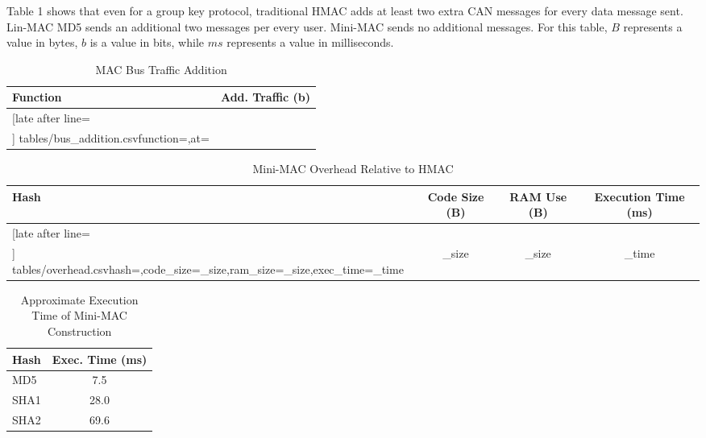 Table 1 shows that even for a group key protocol, traditional HMAC adds at least two extra CAN messages for every data message sent. Lin-MAC MD5 sends an additional two messages per every user. Mini-MAC sends no additional messages. For this table, $B$ represents a value in bytes, $b$ is a value in bits, while $ms$ represents a value in milliseconds.
	
	\begin{table}
	\centering
	\caption{MAC Bus Traffic Addition}
	\vspace{8pt}
	\begin{tabular}{|l|c|}\hline%
	\bfseries Function & \bfseries Add. Traffic (b) \\\hline \csvreader[late after line=\\]%
		{tables/bus_addition.csv}{function=\function,at=\at}%
		{\function & \at}%
		\hline
	\end{tabular}
	\end{table}

	\begin{table}	
	\centering	
	\caption{Mini-MAC Overhead Relative to HMAC}
	\vspace{8pt}
	\begin{tabular}{|l|c|c|c|}\hline%
	\bfseries Hash & \bfseries Code Size (B) & \bfseries RAM Use (B) & \bfseries Execution Time (ms)\\\hline \csvreader[late after line=\\]%
		{tables/overhead.csv}{hash=\hash,code_size=\code_size,ram_size=\ram_size,exec_time=\exec_time}%
		{\hash & \code_size & \ram_size & \exec_time}%
		\hline
	\end{tabular}
	\end{table}
	
	\begin{table}
	\centering
	\caption{Approximate Execution Time of Mini-MAC Construction}
	\vspace{8pt}
	\begin{tabular}{| @{}l | S[table-format=2.1] | @{}}
		\hline 
		\hspace{2pt}\textbf{Hash} & {\textbf{Exec. Time (ms)}} \\
		\hline 
		\hspace{2pt}MD5 & 7.5 \\
		\hspace{2pt}SHA1 & 28.0 \\
		\hspace{2pt}SHA2 & 69.6 \\ 
		\hline
	\end{tabular}	
	\end{table}
	
